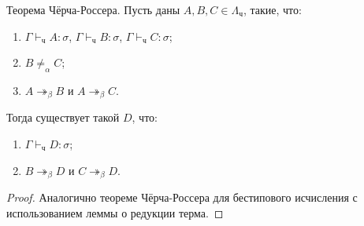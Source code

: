 \documentclass[10pt,a4paper,oneside]{article}
\begin{document}
\begin{theorem} Теорема Чёрча-Россера.
Пусть даны $A,B,C \in \Lambda_\texttt{ч}$, такие, что:
\begin{enumerate}
\item $\Gamma\vdash_\texttt{ч} A:\sigma$, $\Gamma\vdash_\texttt{ч} B:\sigma$, $\Gamma\vdash_\texttt{ч} C:\sigma$;
\item $B \ne_\alpha C$;
\item $A \twoheadrightarrow_\beta B$ и $A \twoheadrightarrow_\beta C$.
\end{enumerate}
Тогда существует такой $D$, что:
\begin{enumerate}
\item $\Gamma\vdash_\texttt{ч} D:\sigma$;
\item $B \twoheadrightarrow_\beta D$ и $C \twoheadrightarrow_\beta D$.
\end{enumerate}
\end{theorem}

\begin{proof} Аналогично теореме Чёрча-Россера для бестипового исчисления
с использованием леммы о редукции терма.
\end{proof}


\end{document}
